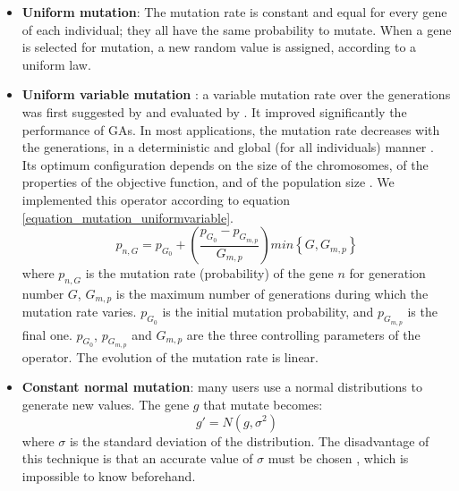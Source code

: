 \documentclass{ametsoc}
\begin{document}
\begin{itemize}
	\item \textbf{Uniform mutation}: The mutation rate is constant and equal for every gene of each individual; they all have the same probability to mutate. When a gene is selected for mutation, a new random value is assigned, according to a uniform law.
	
	\item \textbf{Uniform variable mutation} \citep{Fogarty1989}: a variable mutation rate over the generations was first suggested by \citet{Holland1992b} and evaluated by \citet{Fogarty1989}. It improved significantly the performance of GAs. In most applications, the mutation rate decreases with the generations, in a deterministic and global (for all individuals) manner \citep{Back1992b}. Its optimum configuration depends on the size of the chromosomes, of the properties of the objective function, and of the population size \citep{Back1992b}. We implemented this operator according to equation \ref{equation_mutation_uniformvariable}.
	\begin{equation}
	p_{n,G} = p_{G_{0}}+\left( \dfrac{p_{G_{0}}-p_{G_{m,p}}}{G_{m,p}} \right) min\left\lbrace G,G_{m,p}\right\rbrace 
	\label{equation_mutation_uniformvariable}
	\end{equation}
	where $p_{n,G}$ is the mutation rate (probability) of the gene $n$ for generation number $G$, $G_{m,p}$ is the maximum number of generations during which the mutation rate varies. $p_{G_{0}}$ is the initial mutation probability, and $p_{G_{m,p}}$ is the final one. $p_{G_{0}}$, $p_{G_{m,p}}$ and $G_{m,p}$ are the three controlling parameters of the operator. The evolution of the mutation rate is linear.
	
	\item \textbf{Constant normal mutation}: many users use a normal distributions to generate new values. The gene $g$ that mutate becomes:
	\begin{equation}
	g' = N(g,\sigma^{2})
	\label{equation_mutating_normal_distribution}
	\end{equation}
	where $\sigma$ is the standard deviation of the distribution. The disadvantage of this technique is that an accurate value of $\sigma$ must be chosen \citep{Haupt2004}, which is impossible to know beforehand.
	


\end{itemize}



	
	
\end{document}
